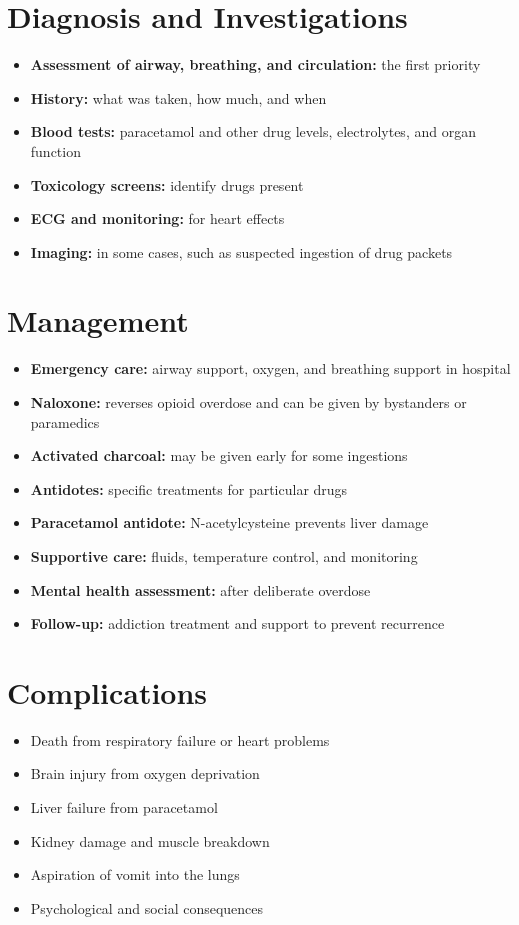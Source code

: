 \section*{Diagnosis and Investigations}
\begin{itemize}
    \item \textbf{Assessment of airway, breathing, and circulation:} the first priority
    \item \textbf{History:} what was taken, how much, and when
    \item \textbf{Blood tests:} paracetamol and other drug levels, electrolytes, and organ function
    \item \textbf{Toxicology screens:} identify drugs present
    \item \textbf{ECG and monitoring:} for heart effects
    \item \textbf{Imaging:} in some cases, such as suspected ingestion of drug packets
\end{itemize}

\section*{Management}
\begin{itemize}
    \item \textbf{Emergency care:} airway support, oxygen, and breathing support in hospital
    \item \textbf{Naloxone:} reverses opioid overdose and can be given by bystanders or paramedics
    \item \textbf{Activated charcoal:} may be given early for some ingestions
    \item \textbf{Antidotes:} specific treatments for particular drugs
    \item \textbf{Paracetamol antidote:} N-acetylcysteine prevents liver damage
    \item \textbf{Supportive care:} fluids, temperature control, and monitoring
    \item \textbf{Mental health assessment:} after deliberate overdose
    \item \textbf{Follow-up:} addiction treatment and support to prevent recurrence
\end{itemize}

\section*{Complications}
\begin{itemize}
    \item Death from respiratory failure or heart problems
    \item Brain injury from oxygen deprivation
    \item Liver failure from paracetamol
    \item Kidney damage and muscle breakdown
    \item Aspiration of vomit into the lungs
    \item Psychological and social consequences
\end{itemize}

